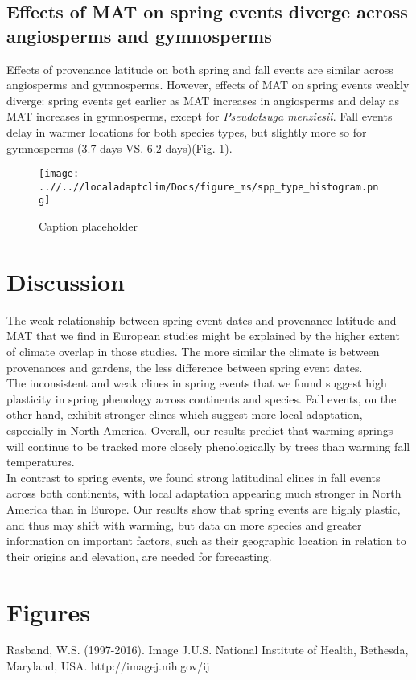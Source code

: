 \documentclass{article}
\begin{document}
\subsection{Effects of MAT on spring events diverge across angiosperms and gymnosperms}

Effects of provenance latitude on both spring and fall events are similar across angiosperms and gymnosperms. However, effects of MAT on spring events weakly diverge: spring events get earlier as MAT increases in angiosperms and delay as MAT increases in gymnosperms, except for \emph{Pseudotsuga menziesii}. Fall events delay in warmer locations for both species types, but slightly more so for gymnosperms (3.7 days VS. 6.2 days)(Fig. \ref{figure:spp_type}).

\begin{figure}[!h] 
    \centering
 \texttt{[image: ..//..//localadaptclim/Docs/figure\_ms/spp\_type\_histogram.png]}
    \caption{Caption placeholder}
    \label{figure:spp_type}
\end{figure}


\section{Discussion}




The weak relationship between spring event dates and provenance latitude and MAT that we find in European studies might be explained by the higher extent of climate overlap in those studies. The more similar the climate is between provenances and gardens, the less difference between spring event dates.
\\

The inconsistent and weak clines in spring events that we found suggest high plasticity in spring phenology across continents and species. Fall events, on the other hand, exhibit stronger clines which suggest more local adaptation, especially in North America. Overall, our results predict that warming springs will continue to be tracked more closely phenologically by trees than warming fall temperatures.
\\

In contrast to spring events, we found strong latitudinal clines in fall events across both continents, with local adaptation appearing much stronger in North America than in Europe. Our results show that spring events are highly plastic, and thus may shift with warming, but data on more species and greater information on important factors, such as their geographic location in relation to their origins and elevation, are needed for forecasting. 






\citet{Keir11}



\section{Figures}


Rasband, W.S. (1997-2016). Image J.U.S. National Institute of Health, Bethesda, Maryland, USA.
http://imagej.nih.gov/ij


\end{document}
